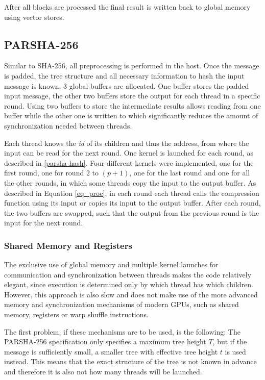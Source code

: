 \documentclass[letterpaper]{article}
\begin{document}
After all blocks are processed the final result is written back to global memory using vector stores.

\subsection{PARSHA-256}
Similar to SHA-256, all preprocessing is performed in the host. Once the message is padded, the tree structure and all necessary information to hash the input message is known, 3 global buffers are allocated. One buffer stores the padded input message, the other two buffers store the output for each thread in a specific round. Using two buffers to store the intermediate results allows reading from one buffer while the other one is written to which significantly reduces the amount of synchronization needed between threads.

Each thread knows the \emph{id} of its children and thus the address, from where the input can be read for the next round. One kernel is launched for each round, as described in \ref{parsha-hash}. Four different kernels were implemented, one for the first round, one for round 2 to $(p+1)$, one for the last round and one for all the other rounds, in which some threads copy the input to the output buffer. As described in Equation \ref{eq_proc},  in each round each thread calls the compression function using its input or copies its input to the output buffer. After each round, the two buffers are swapped, such that the output from the previous round is the input for the next round. 

\subsubsection{Shared Memory and Registers}\label{optimzations}
The exclusive use of global memory and multiple kernel launches for communication and synchronization between threads makes the code relatively elegant, since execution is determined only by which thread has which children. However, this approach is also slow and does not make use of the more advanced memory and synchronization mechanisms of modern GPUs, such as shared memory, registers or warp shuffle instructions.

The first problem, if these mechanisms are to be used, is the following: The PARSHA-256 specification only specifies a maximum tree height $T$, but if the message is sufficiently small, a smaller tree with effective tree height $t$ is used instead. This means that the exact structure of the tree is not known in advance and therefore it is also not how many threads will be launched.
\end{document}

